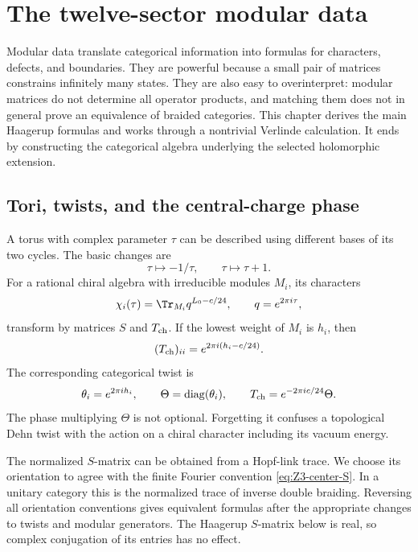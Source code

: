 \chapter{The twelve-sector modular data}
\label{ch:modular}

Modular data translate categorical information into formulas for
characters, defects, and boundaries.  They are powerful because a
small pair of matrices constrains infinitely many states.  They are
also easy to overinterpret: modular matrices do not determine all
operator products, and matching them does not in general prove an
equivalence of braided categories.  This chapter derives the main
Haagerup formulas and works through a nontrivial Verlinde calculation.
It ends by constructing the categorical algebra underlying the
selected holomorphic extension.

\section{Tori, twists, and the central-charge phase}

A torus with complex parameter $\tau$ can be described using different
bases of its two cycles.  The basic changes are
\[
 \tau\longmapsto-1/\tau,\qquad \tau\longmapsto\tau+1.
\]
For a rational chiral algebra with irreducible modules $M_i$, its
characters
\[
 \chi_i(\tau)=\Tr_{M_i}q^{L_0-c/24},\qquad q=e^{2\pi i\tau},
\]
transform by matrices $S$ and $T_{\rm ch}$.  If the lowest weight
of $M_i$ is $h_i$, then
\begin{equation}
 (T_{\rm ch})_{ii}=e^{2\pi i(h_i-c/24)}.
 \label{eq:character-T-general}
\end{equation}
The corresponding categorical twist is
\begin{equation}
 \theta_i=e^{2\pi i h_i},\qquad
 \Theta=\operatorname{diag}(\theta_i),\qquad
 T_{\rm ch}=e^{-2\pi i c/24}\Theta.
 \label{eq:twist-character-distinction}
\end{equation}
The phase multiplying $\Theta$ is not optional.  Forgetting it
confuses a topological Dehn twist with the action on a chiral
character including its vacuum energy.

The normalized $S$-matrix can be obtained from a Hopf-link trace.
We choose its orientation to agree with the finite Fourier convention
\eqref{eq:Z3-center-S}.  In a unitary category this is the normalized
trace of inverse double braiding.  Reversing all orientation
conventions gives equivalent formulas after the appropriate changes
to twists and modular generators.  The Haagerup $S$-matrix below is
real, so complex conjugation of its entries has no effect.

